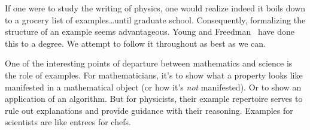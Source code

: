 If one were to study the writing of physics, one would realize indeed it
boils down to a grocery list of examples\dots until graduate
school. Consequently, formalizing the structure of an example seems
advantageous. Young and Freedman~\cite{young} have done this to a degree. We
attempt to follow it throughout as best as we can.

One of the interesting points of departure between mathematics and
science is the role of examples. For mathematicians, it's to show what a
property looks like manifested in a mathematical object (or how it's
\emph{not} manifested). Or to show an application of an algorithm. But
for physicists, their example repertoire serves to rule out explanations
and provide guidance with their reasoning. Examples for scientists are
like entrees for chefs.

\vfil
{}
